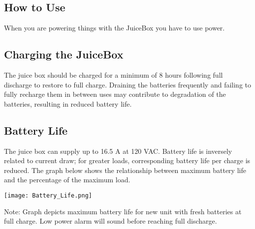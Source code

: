 \documentclass[../jb_user_manual.tex]{subfiles}
\begin{document}
\subsection{How to Use} 
When you are powering things with the JuiceBox you have to use power.
\subsection{Charging the JuiceBox}

The juice box should be charged for a minimum of 8 hours following full discharge to restore to full charge.  Draining the batteries frequently and failing to fully recharge them in between uses may contribute to degradation of the batteries, resulting in reduced battery life.

\subsection{Battery Life}

 The juice box can supply up to 16.5 A at 120 VAC.  Battery life is inversely related to current draw; for greater loads, corresponding battery life per charge is reduced.  The graph below shows the relationship between maximum battery life and the percentage of the maximum load.

\vspace{3mm}
\texttt{[image: Battery\_Life.png]}

Note:  Graph depicts maximum battery life for new unit with fresh batteries at full charge.  Low power alarm will sound before reaching full discharge.
\end{document}

